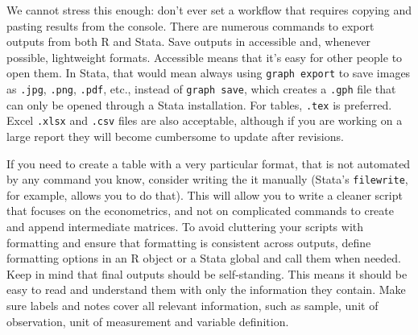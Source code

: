 We cannot stress this enough: don't ever set a workflow that requires copying and pasting results from the console.
There are numerous commands to export outputs from both R and Stata.
Save outputs in accessible and, whenever possible, lightweight formats.
Accessible means that it's easy for other people to open them.
In Stata, that would mean always using \texttt{graph export} to save images as \texttt{.jpg}, \texttt{.png}, \texttt{.pdf}, etc., instead of \texttt{graph save}, which creates a \texttt{.gph} file that can only be opened through a Stata installation.
For tables, \texttt{.tex} is preferred. 
Excel \texttt{.xlsx} and \texttt{.csv} files are also acceptable, although if you are working on a large report they will become cumbersome to update after revisions.

If you need to create a table with a very particular format, that is not automated by any command you know, consider writing the it manually 
(Stata's \texttt{filewrite}, for example, allows you to do that).
This will allow you to write a cleaner script that focuses on the econometrics, and not on complicated commands to create and append intermediate matrices.
To avoid cluttering your scripts with formatting and ensure that formatting is consistent across outputs,
define formatting options in an R object or a Stata global and call them when needed.
Keep in mind that final outputs should be self-standing.
This means it should be easy to read and understand them with only the information they contain.
Make sure labels and notes cover all relevant information, such as sample, unit of observation, unit of measurement and variable definition.



